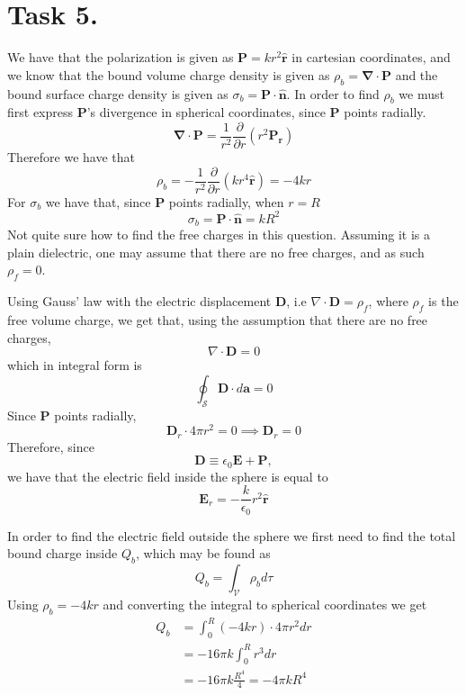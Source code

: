 \documentclass[a4paper,11pt]{article}
\begin{document}
\section*{Task 5.}
\begin{alphalist}
    \item We have that the polarization is given as $\mathbf{P} = kr^2\mathbf{\hat{r}}$ in cartesian coordinates, and we know that the bound volume charge density is
        given as $\rho_b = \pmb{\nabla} \cdot \mathbf{P}$ and the bound surface charge density is given as $\sigma_b = \mathbf{P} \cdot \hat{\mathbf{n}}$. In order to find $\rho_b$ we must
        first express $\mathbf{P}$'s divergence in spherical coordinates, since $\mathbf{P}$ points radially.
        \[
            \pmb{\nabla} \cdot \mathbf{P} = \frac{1}{r^2}\frac{\partial}{\partial r}\left(r^2 \mathbf{P_r}\right)
        \]
        Therefore we have that
        \[
            \rho_b = -\frac{1}{r^2} \frac{\partial}{\partial r} \left(kr^4 \mathbf{\hat{r}}\right) = -4kr
        \]
        For $\sigma_b$ we have that, since $\mathbf{P}$ points radially, when $r = R$ 
        \[
            \sigma_b = \mathbf{P} \cdot \mathbf{\hat{n}} = kR^2
        \]
        Not quite sure how to find the free charges in this question. Assuming it is a plain dielectric, one may assume that there are no free charges, and as such
        $\rho_f = 0$.
    \item Using Gauss' law with the electric displacement $\mathbf{D}$, i.e $\nabla \cdot \mathbf{D} = \rho_f$, where $\rho_f$ is the free volume charge,
        we get that, using the assumption that there are no free charges, 
        \[
            \nabla \cdot \mathbf{D} = 0
        \]
        which in integral form is
        \[
            \oint_{\mathcal{S}} \mathbf{D} \cdot d\mathbf{a} = 0
        \]
        Since $\mathbf{P}$ points radially,
        \[
            \mathbf{D}_r \cdot 4\pi r^2 = 0 \implies \mathbf{D}_r = 0
        \]
        Therefore, since 
        \[
            \mathbf{D} \equiv \epsilon_0 \mathbf{E} + \mathbf{P},
        \]
        we have that the electric field inside the sphere is equal to
        \[
            \mathbf{E}_r = -\frac{k}{\epsilon_0}r^2 \mathbf{\hat{r}}
        \]

        In order to find the electric field outside the sphere we first need to find the total bound charge inside $Q_b$, which may be found as
        \[
            Q_b = \int_{\mathcal{V}} \rho_b d\tau
        \]
        Using $\rho_b = -4kr$ and converting the integral to spherical coordinates we get
        \begin{align*}
            Q_b &= \int_{0}^{R} (-4kr) \cdot 4\pi r^2 dr \\
                &= -16\pi k \int_{0}^{R} r^3 dr \\ 
                &= -16\pi k \frac{R^4}{4} = -4\pi k R^4
        \end{align*}


\end{alphalist}
\end{document}
